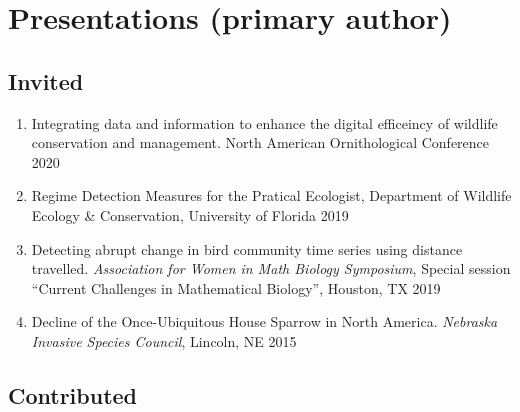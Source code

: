 \documentclass[11pt,]{article}
\begin{document}
\hypertarget{presentations-primary-author}{%
\section{Presentations (primary
author)}\label{presentations-primary-author}}

\hypertarget{invited}{%
\subsection{Invited}\label{invited}}

\begin{enumerate}
\def\labelenumi{\arabic{enumi}.}
\item
  Integrating data and information to enhance the digital efficeincy of
  wildlife conservation and management. North American Ornithological
  Conference \hfill 2020
\item
  Regime Detection Measures for the Pratical Ecologist, Department of
  Wildlife Ecology \& Conservation, University of Florida \hfill 2019
\item
  Detecting abrupt change in bird community time series using distance
  travelled. \emph{Association for Women in Math Biology Symposium},
  Special session ``Current Challenges in Mathematical Biology'',
  Houston, TX \hfill 2019
\item
  Decline of the Once-Ubiquitous House Sparrow in North America.
  \emph{Nebraska Invasive Species Council}, Lincoln, NE \hfill 2015
\end{enumerate}

\hypertarget{contributed}{%
\subsection{Contributed}\label{contributed}}
\end{document}
